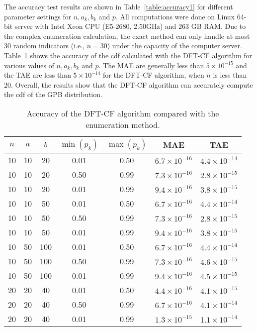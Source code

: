 \documentclass[12pt]{article}
\begin{document}
The accuracy test results are shown in Table~\ref{table:accuracy1} for different parameter settings for $n, a_k, b_k$ and $p$. All computations were done on Linux 64-bit server with Intel Xeon CPU (E5-2680, 2.50GHz) and 263 GB RAM. Due to the complex enumeration calculation, the exact method can only handle at most 30 random indicators (i.e., $n=30$) under the capacity of the computer server. Table~\ref{tab:hresult} shows the accuracy of the cdf calculated with the DFT-CF algorithm for various values of $n, a_k, b_k$ and $p$. The MAE are generally less than $5\times10^{-15}$ and the TAE are less than $5\times10^{-14}$ for the DFT-CF algorithm, when $n$ is less than 20. Overall, the results show that the DFT-CF algorithm can accurately compute the cdf of the GPB distribution.

\begin{table}
\caption{Accuracy of the DFT-CF algorithm compared with the enumeration method.}\label{tab:hresult}
\vspace{1ex}
\centering
\begin{tabular}{c c c c c c c}
\hline\hline
$n$& $a$ & $b$ & $\min(p_k)$ & $\max(p_k)$ & MAE & TAE \\\hline
10  &10    &20 &0.01&0.50        &$6.7\times10^{-16}$&$4.4\times10^{-14}$ \\
10  &10    &20 &0.50&0.99        &$7.3\times10^{-16}$&$2.8\times10^{-15}$ \\
10  &10    &20 &0.01&0.99        &$9.4\times10^{-16}$&$3.8\times10^{-15}$ \\\hline
10  &10    &50 &0.01&0.50        &$6.7\times10^{-16}$&$4.4\times10^{-14}$ \\
10  &10    &50 &0.50&0.99        &$7.3\times10^{-16}$&$2.8\times10^{-15}$ \\
10  &10    &50 &0.01&0.99        &$9.4\times10^{-16}$&$3.8\times10^{-15}$ \\\hline
10  &50    &100&0.01&0.50        &$6.7\times10^{-16}$&$4.4\times10^{-14}$ \\
10  &50    &100&0.50&0.99        &$7.3\times10^{-16}$&$4.6\times10^{-15}$ \\
10  &50    &100&0.01&0.99        &$9.4\times10^{-16}$&$4.5\times10^{-15}$ \\\hline
20  &20    &40 &0.01&0.50        &$4.4\times10^{-16}$&$4.1\times10^{-15}$ \\
20  &20    &40 &0.50&0.99        &$6.7\times10^{-16}$&$4.1\times10^{-14}$ \\
20  &20    &40 &0.01&0.99        &$1.3\times10^{-15}$&$1.1\times10^{-14}$ \\\hline

\end{tabular}
\end{table}
\end{document}
